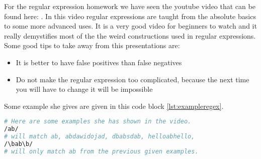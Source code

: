 For the regular expression homework we have seen the youtube video that can be found here: \cite{leaverou1}. In this video regular expressions are taught from the absolute basics to some more advanced uses. It is a very good video for beginners to watch and it really demystifies most of the the weird constructions used in regular expressions. Some good tips to take away from this presentations are:
\begin{itemize}
\item It is better to have false positives than false negatives
\item Do not make the regular expression too complicated, because the next time you will have to change it will be impossible
\end{itemize}
Some example she gives are given in this code block \ref{lst:exampleregex}.

\begin{lstlisting}[language=bash,label=lst:exampleregex,caption=Regex examples]
# Here are some examples she has shown in the video.
/ab/
# will match ab, abdawidojad, dbabsdab, helloabhello,
/\bab\b/ 
# will only match ab from the previous given examples.
\end{lstlisting}